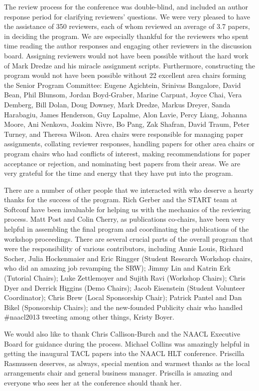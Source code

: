 \documentclass[11pt]{article}
\begin{document}
The review process for the conference was double-blind, and included an author response period for
clarifying reviewers’ questions. We were very pleased to have the assistance of 350 reviewers, each of whom reviewed an average of 3.7 papers, in deciding the program. We are especially thankful for the reviewers who spent time reading the author responses and engaging other reviewers in the discussion board. Assigning reviewers would not have been possible without the hard work of Mark Dredze and his miracle assignment scripts. Furthermore, constructing the program would not have been possible without 22 excellent area chairs forming the Senior Program Committee: Eugene Agichtein, Srinivas Bangalore, David Bean, Phil Blunsom, Jordan Boyd-Graber, Marine Carpuat, Joyce Chai, Vera Demberg, Bill Dolan, Doug Downey, Mark Dredze, Markus Dreyer, Sanda Harabagiu, James Henderson, Guy Lapalme, Alon Lavie, Percy Liang, Johanna Moore, Ani Nenkova, Joakim Nivre, Bo Pang, Zak Shafran, David Traum, Peter Turney, and Theresa Wilson. Area chairs were responsible for managing paper assignments, collating reviewer responses, handling papers for other area chairs or program chairs who had conflicts of interest, making recommendations for paper acceptance or rejection, and nominating best papers from their areas. We are very grateful for the time and energy that they have put into the program.

There are a number of other people that we interacted with who deserve a hearty thanks for the success of the program. Rich Gerber and the START team at Softconf have been invaluable for helping us with the mechanics of the reviewing process. Matt Post and Colin Cherry, as publications co-chairs, have been very helpful in assembling the final program and coordinating the publications of the workshop proceedings. There are several crucial parts of the overall program that were the responsibility of various contributors, including Annie Louis, Richard Socher, Julia Hockenmaier and Eric Ringger (Student Research Workshop chairs, who did an amazing job revamping the SRW); Jimmy Lin and Katrin Erk (Tutorial Chairs); Luke Zettlemoyer and Sujith Ravi (Workshop Chairs); Chris Dyer and Derrick Higgins (Demo Chairs); Jacob Eisenstein (Student Volunteer Coordinator); Chris Brew (Local Sponsorship Chair); Patrick Pantel and Dan Bikel (Sponsorship Chairs); and the new-founded Publicity chair who handled \#naacl2013 tweeting among other things, Kristy Boyer.

We would also like to thank Chris Callison-Burch and the NAACL Executive Board for guidance during the process. Michael Collins was amazingly helpful in getting the inaugural TACL papers into the NAACL HLT conference. Priscilla Rasmussen deserves, as always, special mention and warmest thanks as the local arrangements chair and general business manager. Priscilla is amazing and everyone who sees her at the conference should thank her.
\end{document}
